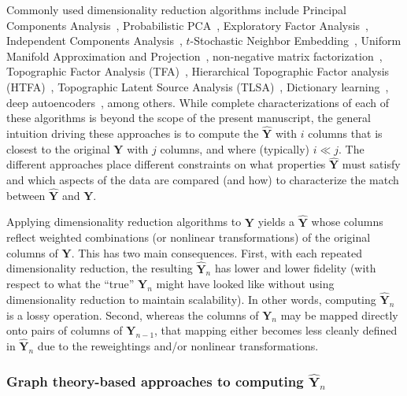 \documentclass[english]{article}
\begin{document}
Commonly used dimensionality reduction algorithms include Principal
Components Analysis~\citep[PCA; ][]{Pear01}, Probabilistic
PCA~\citep[PPCA; ][]{TippBish99}, Exploratory Factor
Analysis~\citep[EFA; ][]{Spea04}, Independent Components
Analysis~\citep[ICA; ][]{JuttHera91, ComoEtal91}, $t$-Stochastic
Neighbor Embedding~\citep[$t$-SNE; ][]{MaatHint08}, Uniform Manifold
Approximation and Projection~\citep[UMAP; ][]{McInHeal18},
non-negative matrix factorization~\citep[NMF; ][]{LeeSeun99},
Topographic Factor Analysis (TFA)~\cite{MannEtal14b}, Hierarchical
Topographic Factor analysis (HTFA)~\cite{MannEtal18}, Topographic
Latent Source Analysis (TLSA)~\cite{GersEtal11}, Dictionary
learning~\citep{MairEtal09a, MairEtal09b}, deep
autoencoders~\citep{HintSala06}, among others.  While complete
characterizations of each of these algorithms is beyond the scope of
the present manuscript, the general intuition driving these
approaches is to compute the $\hat{\mathbf{Y}}$ with $i$ columns that
is closest to the original $\mathbf{Y}$ with $j$ columns, and where
(typically) $i \ll j$.  The different approaches place different
constraints on what properties $\hat{\mathbf{Y}}$ must satisfy and
which aspects of the data are compared (and how) to characterize the
match between $\hat{\mathbf{Y}}$ and  $\mathbf{Y}$.

Applying dimensionality reduction algorithms to $\mathbf{Y}$ yields a
$\hat{\mathbf{Y}}$ whose columns reflect weighted combinations (or
nonlinear transformations) of the original columns of $\mathbf{Y}$.
This has two main consequences.  First, with each repeated
dimensionality reduction, the resulting $\hat{\mathbf{Y}}_n$ has lower
and lower fidelity (with respect to what the ``true'' $\mathbf{Y}_n$
might have looked like without using dimensionality reduction to
maintain scalability).  In other words, computing $\hat{\mathbf{Y}}_n$
is a lossy operation.  Second, whereas the columns of $\mathbf{Y}_n$
may be mapped directly onto pairs of columns of $\mathbf{Y}_{n-1}$,
that mapping either becomes less cleanly defined in
$\hat{\mathbf{Y}}_n$ due to the reweightings and/or nonlinear
transformations.

\subsubsection*{Graph theory-based approaches to computing
  $\hat{\mathbf{Y}}_n$}
\end{document}

